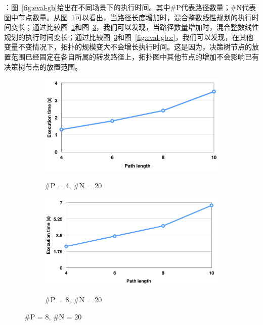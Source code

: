 ：图~\ref{fig:eval-gb}给出在不同场景下的执行时间。其中\#P代表路径数量；\#N代表图中节点数量。从图~\ref{fig:eval-gb:a}可以看出，当路径长度增加时，混合整数线性规划的执行时间变长；通过比较图~\ref{fig:eval-gb:a}和图~\ref{fig:eval-gb:b}，我们可以发现，当路径数量增加时，混合整数线性规划的执行时间变长；通过比较图~\ref{fig:eval-gb:b}和图~\ref{fig:eval-gb:c}，我们可以发现，在其他变量不变情况下，拓扑的规模变大不会增长执行时间。这是因为，决策树节点的放置范围已经固定在各自所属的转发路径上，拓扑图中其他节点的增加不会影响已有决策树节点的放置范围。


\begin{figure}
  \centering

  \begin{subfigure}[b]{0.4\textwidth}
      \includegraphics[width=\textwidth]{figures/global-eval-420-png.png}
      \label{fig:eval-gb:a}
      \caption{\#P = 4, \#N = 20}
  \end{subfigure}

  \hspace{1in}

  \begin{subfigure}[b]{0.4\textwidth}
      \includegraphics[width=\textwidth]{figures/global-eval-820-png.png}
      \label{fig:eval-gb:b}
      \caption{\#P = 8, \#N = 20}
  \end{subfigure}


\end{figure}
